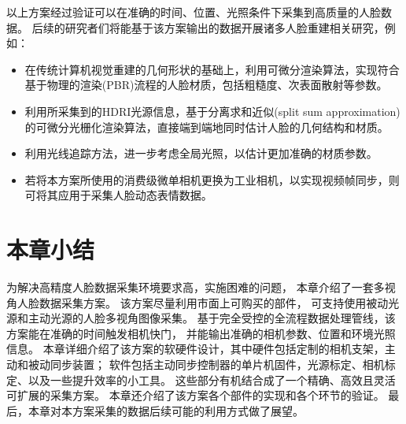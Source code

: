 以上方案经过验证可以在准确的时间、位置、光照条件下采集到高质量的人脸数据。
后续的研究者们将能基于该方案输出的数据开展诸多人脸重建相关研究，例如：
\begin{itemize}
\item 在传统计算机视觉重建的几何形状的基础上，利用可微分渲染算法，实现符合基于物理的渲染(PBR)流程的人脸材质，包括粗糙度、次表面散射等参数。
\item 利用所采集到的HDRI光源信息，基于分离求和近似(split sum approximation)的可微分光栅化渲染算法，直接端到端地同时估计人脸的几何结构和材质。
\item 利用光线追踪方法，进一步考虑全局光照，以估计更加准确的材质参数。
\item 若将本方案所使用的消费级微单相机更换为工业相机，以实现视频帧同步，则可将其应用于采集人脸动态表情数据。
\end{itemize}

\section*{本章小结}

为解决高精度人脸数据采集环境要求高，实施困难的问题，
本章介绍了一套多视角人脸数据采集方案。
该方案尽量利用市面上可购买的部件，
可支持使用被动光源和主动光源的人脸多视角图像采集。
基于完全受控的全流程数据处理管线，该方案能在准确的时间触发相机快门，
并能输出准确的相机参数、位置和环境光照信息。
本章详细介绍了该方案的软硬件设计，其中硬件包括定制的相机支架，主动和被动同步装置；
软件包括主动同步控制器的单片机固件，光源标定、相机标定、以及一些提升效率的小工具。
这些部分有机结合成了一个精确、高效且灵活可扩展的采集方案。
本章还介绍了该方案各个部件的实现和各个环节的验证。
最后，本章对本方案采集的数据后续可能的利用方式做了展望。
